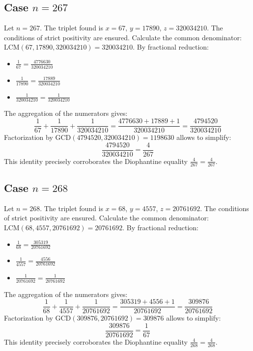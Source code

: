 \documentclass[11pt,a4paper]{article}
\begin{document}
\subsection{Case $n = 267$}
Let $n = 267$. The triplet found is $x = 67$, $y = 17890$, $z = 320034210$.
The conditions of strict positivity are ensured.
Calculate the common denominator: $\text{LCM}(67, 17890, 320034210) = 320034210$.
By fractional reduction:
\begin{itemize}
    \item $\frac{1}{67} = \frac{4776630}{320034210}$
    \item $\frac{1}{17890} = \frac{17889}{320034210}$
    \item $\frac{1}{320034210} = \frac{1}{320034210}$
\end{itemize}
The aggregation of the numerators gives:
$$ \frac{1}{67} + \frac{1}{17890} + \frac{1}{320034210} = \frac{4776630 + 17889 + 1}{320034210} = \frac{4794520}{320034210} $$
Factorization by $\text{GCD}(4794520, 320034210) = 1198630$ allows to simplify:
$$ \frac{4794520}{320034210} = \frac{4}{267} $$
This identity precisely corroborates the Diophantine equality $\frac{4}{267} = \frac{4}{267}$.

\subsection{Case $n = 268$}
Let $n = 268$. The triplet found is $x = 68$, $y = 4557$, $z = 20761692$.
The conditions of strict positivity are ensured.
Calculate the common denominator: $\text{LCM}(68, 4557, 20761692) = 20761692$.
By fractional reduction:
\begin{itemize}
    \item $\frac{1}{68} = \frac{305319}{20761692}$
    \item $\frac{1}{4557} = \frac{4556}{20761692}$
    \item $\frac{1}{20761692} = \frac{1}{20761692}$
\end{itemize}
The aggregation of the numerators gives:
$$ \frac{1}{68} + \frac{1}{4557} + \frac{1}{20761692} = \frac{305319 + 4556 + 1}{20761692} = \frac{309876}{20761692} $$
Factorization by $\text{GCD}(309876, 20761692) = 309876$ allows to simplify:
$$ \frac{309876}{20761692} = \frac{1}{67} $$
This identity precisely corroborates the Diophantine equality $\frac{4}{268} = \frac{4}{268}$.
\end{document}
